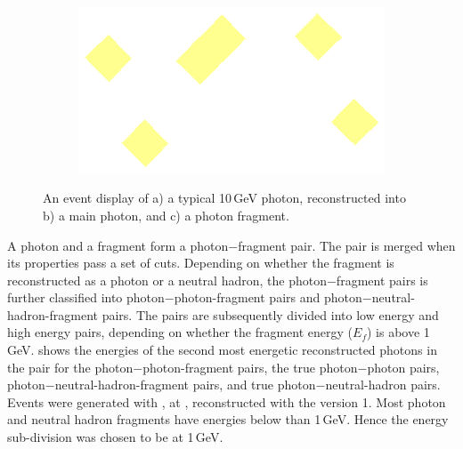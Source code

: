 \begin{figure}[tbph]
\begin{subfigure}[b]{0.3\textwidth}
    \label{fig:photonEvtDspPhotonFragBig}
  \end{subfigure}
  \begin{subfigure}[b]{0.3\textwidth}
    \includegraphics[width=\textwidth]{photon/small}
    \caption{}
    \label{fig:photonEvtDspPhotonFragSmall}
  \end{subfigure}
\caption
{An event display of a) a typical 10\,GeV photon, reconstructed into  b) a main photon,  and c) a photon fragment. }
\label{fig:photonEvtDspPhotonFrag}
\end{figure}




A photon and a fragment form a photon$-$fragment pair.  The pair is merged when its properties pass a set of cuts. Depending on whether the fragment is reconstructed as a photon or a neutral hadron, the photon$-$fragment pairs is further classified into photon$-$photon-fragment pairs and photon$-$neutral-hadron-fragment pairs. The pairs are subsequently  divided into low energy and high energy pairs, depending on whether the fragment energy ($E_f$) is above 1\,GeV.  shows the energies of the second most energetic reconstructed photons in the pair for the photon$-$photon-fragment pairs, the true photon$-$photon pairs, photon$-$neutral-hadron-fragment pairs, and true photon$-$neutral-hadron pairs. Events were generated with \eeZuds, at , reconstructed with the \pandora version 1. Most photon and neutral hadron fragments have energies below than 1\,GeV. Hence the energy sub-division was chosen to be at 1\,GeV.

